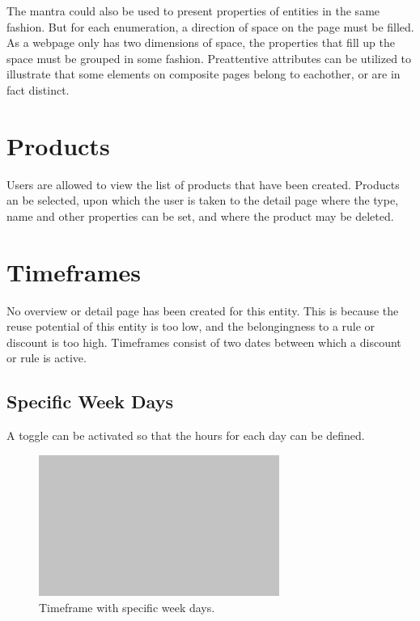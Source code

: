 The mantra could also be used to present properties of entities in the same fashion. But for each enumeration, a direction of space on the page must be filled. As a webpage only has two dimensions of space, the properties that fill up the space must be grouped in some fashion. Preattentive attributes can be utilized to illustrate that some elements on composite pages belong to eachother, or are in fact distinct.

%
\section{Products}
Users are allowed to view the list of products that have been created. Products an be selected, upon which the user is taken to the detail page where the type, name and other properties can be set, and where the product may be deleted.

%
\section{Timeframes}
No overview or detail page has been created for this entity. This is because the reuse potential of this entity is too low, and the belongingness to a rule or discount is too high. Timeframes consist of two dates between which a discount or rule is active.

\subsection{Specific Week Days}
A toggle can be activated so that the hours for each day can be defined.

\begin{figure}[H]
	\centering
	\includegraphics[width=0.7\textwidth]{Blank}
	\caption[Timeframe Component]{Timeframe with specific week days.}
	\label{fig:Timeframe Component}
\end{figure}

